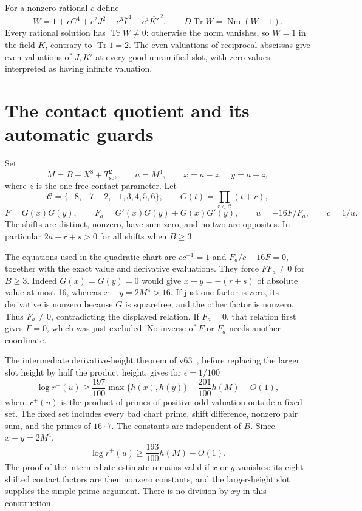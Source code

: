 \documentclass[11pt,a4paper]{article}
\DeclareMathOperator{\Tr}{Tr}\DeclareMathOperator{\Nm}{Nm}
\begin{document}
For a nonzero rational $c$ define
\begin{equation}\label{eq:detector}
 W=1+cC^4+c^2J^2-c^3\overline I^{\,4}-c^4\overline{K'}^{\,2},
 \qquad D\Tr W=\Nm(W-1).
\end{equation}
Every rational solution has $\Tr W\ne0$: otherwise the norm vanishes,
so $W=1$ in the field $K$, contrary to $\Tr 1=2$.
The even valuations of reciprocal abscissas give even valuations of
$J,K'$ at every good unramified slot, with zero values interpreted as
having infinite valuation.

\section{The contact quotient and its automatic guards}

Set
\[
 M=B+X^8+T_{\mathrm{sc}}^2,\qquad a=M^4,\qquad
 x=a-z,\quad y=a+z,
\]
where $z$ is the one free contact parameter. Let
\[
 \mathcal C=\{-8,-7,-2,-1,3,4,5,6\},\qquad
 G(t)=\prod_{r\in\mathcal C}(t+r),
\]
\begin{equation}\label{eq:derivative}
 F=G(x)G(y),\qquad F_a=G'(x)G(y)+G(x)G'(y),\qquad
 u=-16F/F_a,\qquad c=1/u.
\end{equation}
The shifts are distinct, nonzero, have sum zero, and no two are
opposites. In particular $2a+r+s>0$ for all shifts when $B\ge3$.

The equations used in the quadratic chart are $c c^{-1}=1$ and
$F_a/c+16F=0$, together with the exact value and derivative evaluations.
They force $F F_a\ne0$ for $B\ge3$. Indeed $G(x)=G(y)=0$ would give
$x+y=-(r+s)$ of absolute value at most 16, whereas $x+y=2M^4>16$.
If just one factor is zero, its derivative is nonzero because $G$ is
squarefree, and the other factor is nonzero. Thus $F_a\ne0$, contradicting
the displayed relation. If $F_a=0$, that relation first gives $F=0$,
which was just excluded. No inverse of $F$ or $F_a$ needs another
coordinate.

The intermediate derivative-height theorem of v63~\cite{v63}, before
replacing the larger slot height by half the product height, gives for
$\epsilon=1/100$
\[
 \log r^+(u)\ge\frac{197}{100}\max\{h(x),h(y)\}
                         -\frac{201}{100}h(M)-O(1),
\]
where $r^+(u)$ is the product of primes of positive odd valuation
outside a fixed set. The fixed set includes every bad chart prime,
shift difference, nonzero pair sum, and the primes of $16\cdot7$.
The constants are independent of $B$. Since $x+y=2M^4$,
\begin{equation}\label{eq:radical}
             \log r^+(u)\ge\frac{193}{100}h(M)-O(1).
\end{equation}
The proof of the intermediate estimate remains valid if $x$ or $y$
vanishes: its eight shifted contact factors are then nonzero constants,
and the larger-height slot supplies the simple-prime argument.
There is no division by $xy$ in this construction.
\end{document}
